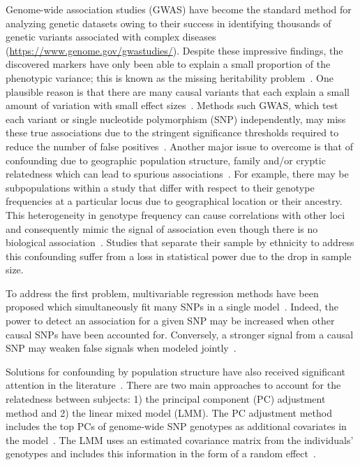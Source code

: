 \documentclass[10pt,letterpaper]{article}
\begin{document}
Genome-wide association studies (GWAS) have become the standard method for analyzing genetic datasets owing to their success in identifying thousands of genetic variants associated with complex diseases (\url{https://www.genome.gov/gwastudies/}).
Despite these impressive findings, the discovered markers have only been able to explain a small proportion of the phenotypic variance; this is known as the missing heritability problem~\cite{manolio2009finding}.
One plausible reason is that there are many causal variants that each explain a small amount of variation with small effect sizes~\cite{yang2010common}.
Methods such GWAS, which test each variant or single nucleotide polymorphism (SNP) independently, may miss these true associations due to the stringent significance thresholds required to reduce the number of false positives~\cite{manolio2009finding}.
Another major issue to overcome is that of confounding due to geographic population structure, family and/or cryptic relatedness which can lead to spurious associations~\cite{astle2009population}.
For example, there may be subpopulations within a study that differ with respect to their genotype frequencies at a particular locus due to geographical location or their ancestry.
This heterogeneity in genotype frequency can cause correlations with other loci and consequently mimic the signal of association even though there is no biological association~\cite{song2015testing,marchini2004effects}.
Studies that separate their sample by ethnicity to address this confounding suffer from a loss in statistical power due to the drop in sample size.

To address the first problem, multivariable regression methods have been proposed which simultaneously fit many SNPs in a single model~\cite{hoggart2008simultaneous,li2010bayesian}. Indeed, the power to detect an association for a given SNP may be increased when other causal SNPs have been accounted for. Conversely, a stronger signal from a causal SNP may weaken false signals when modeled jointly~\cite{hoggart2008simultaneous}.

Solutions for confounding by population structure have also received significant attention in the literature~\cite{lippert2011fast,kang2010variance,yu2006unified,eu2014comparison}.
There are two main approaches to account for the relatedness between subjects: 1) the principal component (PC) adjustment method and 2) the linear mixed model (LMM).
The PC adjustment method includes the top PCs of genome-wide SNP genotypes as additional covariates in the model~\cite{price2006principal}.
The LMM uses an estimated covariance matrix from the individuals' genotypes and includes this information in the form of a random effect~\cite{astle2009population}.
\end{document}
